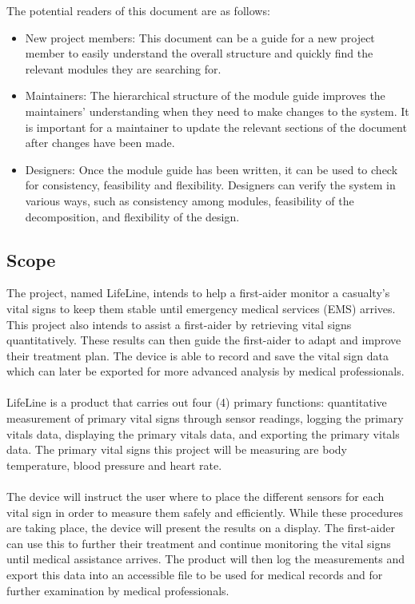 \documentclass{article}
\begin{document}
     The potential readers of this document are as follows:
    
    \begin{itemize}
    \item New project members: This document can be a guide for a new project member
      to easily understand the overall structure and quickly find the
      relevant modules they are searching for.
    \item Maintainers: The hierarchical structure of the module guide improves the
      maintainers' understanding when they need to make changes to the system. It is
      important for a maintainer to update the relevant sections of the document
      after changes have been made.
    \item Designers: Once the module guide has been written, it can be used to
      check for consistency, feasibility and flexibility. Designers can verify the
      system in various ways, such as consistency among modules, feasibility of the
      decomposition, and flexibility of the design.
    \end{itemize}
    
    \subsection{Scope}
    
    The project, named LifeLine, intends to help a first-aider monitor a casualty's vital signs to keep them stable until emergency medical services (EMS) arrives. This project also intends to assist a first-aider by retrieving vital signs quantitatively. These results can then guide the first-aider to adapt and improve their treatment plan. The device is able to record and save the vital sign data which can later be exported for more advanced analysis by medical professionals.
    \paragraph{}
    LifeLine is a product that carries out four (4) primary functions: quantitative measurement of primary vital signs through sensor readings, logging the primary vitals data, displaying the primary vitals data, and exporting the primary vitals data. The primary vital signs this project will be measuring are body temperature, blood pressure and heart rate. 
	\paragraph{}
	The device will instruct the user where to place the different sensors for each vital sign in order to measure them safely and efficiently. While these procedures are taking place, the device will present the results on a display. The first-aider can use this to further their treatment and continue monitoring the vital signs until medical assistance arrives. The product will then log the measurements and export this data into an accessible file to be used for medical records and for further examination by medical professionals. 
    
\end{document}
